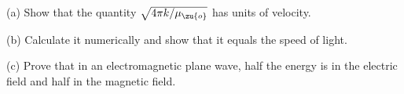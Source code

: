 (a) Show that the quantity $\sqrt{4\pi k/\mu_\zu{o}}$ has units of velocity.

(b) Calculate it numerically and show that it equals the speed of light.

(c) Prove that in an electromagnetic plane wave, half the energy
is in the electric field and half in the magnetic field.
